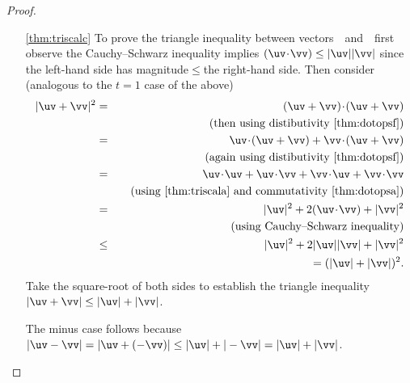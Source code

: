 \begin{proof}
\begin{itemize}
\item[\ref{thm:triscalc}]
To prove the triangle inequality between vectors~\uv\ and~\vv\ first observe the Cauchy--Schwarz inequality implies \((\uv\cdot\vv)\leq|\uv||\vv|\) since the left-hand side has magnitude\({}\leq{}\)the right-hand side.
Then consider (analogous to the \(t=1\) case of the above)
%
\begin{eqnarray*}
|\uv+\vv|^2
&=&(\uv+\vv)\cdot(\uv+\vv)
\\&&\quad(\text{then using distibutivity~\ref{thm:dotopsf}})
\\&=&\uv\cdot(\uv+\vv)+\vv\cdot(\uv+\vv)
\\&&\quad(\text{again using distibutivity~\ref{thm:dotopsf}})
\\&=&\uv\cdot\uv+\uv\cdot\vv+\vv\cdot\uv+\vv\cdot\vv
\\&&\quad(\text{using~\ref{thm:triscala} and commutativity~\ref{thm:dotopsa}})
\\&=&|\uv|^2+2(\uv\cdot\vv)+|\vv|^2
\\&&\quad(\text{using Cauchy--Schwarz inequality})
\\&\leq&|\uv|^2+2|\uv||\vv|+|\vv|^2
\\&&{}=(|\uv|+|\vv|)^2.
\end{eqnarray*}
Take the square-root of both sides to establish the triangle inequality \(|\uv+\vv|\leq|\uv|+|\vv|\).

The minus case follows because \(|\uv-\vv|=|\uv+(-\vv)|\leq|\uv|+|-\vv|=|\uv|+|\vv|\).
%

\end{itemize}
\end{proof}


